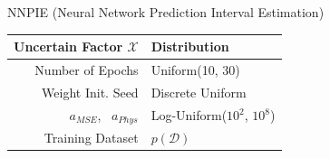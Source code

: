 \documentclass[aspectratio=1610]{beamer}
\begin{document}
\begin{frame}{NNPIE (Neural Network Prediction Interval Estimation)}

\vspace{20pt}

\begin{tabular}{rl}
    \textbf{Uncertain Factor} $\mathcal{X}$ & \textbf{Distribution} \\
    \hline
    Number of Epochs & Uniform(10, 30) \\
    \pause
    Weight Init. Seed & Discrete Uniform \\
    \pause
    $a_{MSE}$, \, $a_{Phys}$ & Log-Uniform($10^2$, $10^8$) \\
    \pause
    Training Dataset & $p(\mathcal{D})$
\end{tabular}
\end{frame}
\end{document}

